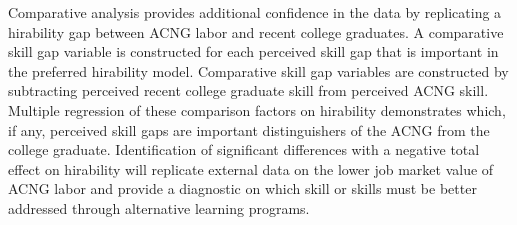 \documentclass[review]{elsarticle}
\begin{document}
Comparative analysis provides additional confidence in the data by replicating a hirability gap between ACNG labor and recent college graduates.
A comparative skill gap variable is constructed for each perceived skill gap that is important in the preferred hirability model.
Comparative skill gap variables are constructed by subtracting perceived recent college graduate skill from perceived ACNG skill.
Multiple regression of these comparison factors on hirability demonstrates which, if any, perceived skill gaps are important distinguishers of the ACNG from the college graduate.
Identification of significant differences with a negative total effect on hirability will replicate external data on the lower job market value of ACNG labor
and provide a diagnostic on which skill or skills must be better addressed through alternative learning programs.


\end{document}
